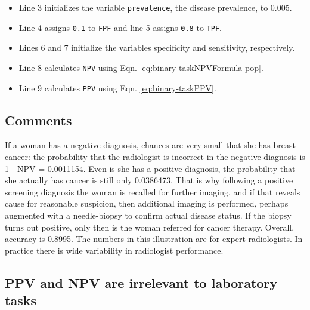 \documentclass[
]{book}
\providecommand{\tightlist}{%
  \setlength{\itemsep}{0pt}\setlength{\parskip}{0pt}}
\begin{document}
\begin{itemize}
\tightlist
\item
  Line 3 initializes the variable \texttt{prevalence}, the disease prevalence, to 0.005.
\item
  Line 4 assigns \texttt{0.1} to \texttt{FPF} and line 5 assigns \texttt{0.8} to \texttt{TPF}.
\item
  Lines 6 and 7 initialize the variables specificity and sensitivity, respectively.
\item
  Line 8 calculates \texttt{NPV} using Eqn. \eqref{eq:binary-taskNPVFormula-pop}.
\item
  Line 9 calculates \texttt{PPV} using Eqn. \eqref{eq:binary-taskPPV}.
\end{itemize}

\hypertarget{binary-taskNpvPpvComments}{%
\subsection{Comments}\label{binary-taskNpvPpvComments}}

If a woman has a negative diagnosis, chances are very small that she has breast cancer: the probability that the radiologist is incorrect in the negative diagnosis is 1 - NPV = 0.0011154. Even is she has a positive diagnosis, the probability that she actually has cancer is still only 0.0386473. That is why following a positive screening diagnosis the woman is recalled for further imaging, and if that reveals cause for reasonable suspicion, then additional imaging is performed, perhaps augmented with a needle-biopsy to confirm actual disease status. If the biopsy turns out positive, only then is the woman referred for cancer therapy. Overall, accuracy is 0.8995. The numbers in this illustration are for expert radiologists. In practice there is wide variability in radiologist performance.

\hypertarget{binary-taskNpvPpvIrrel2LabTasks}{%
\subsection{PPV and NPV are irrelevant to laboratory tasks}\label{binary-taskNpvPpvIrrel2LabTasks}}
\end{document}

